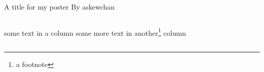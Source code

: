 \documentclass[10pt]{beamer}
\begin{document}
\begin{frame}{}

\begin{block}{\Huge A title for my poster}
    \LARGE By askewchan
\end{block}

\begin{columns}[T]
        some text in a column
        some more text in another\footnote[frame]{a footnote} column
\end{columns}
\end{frame}
\end{document}

